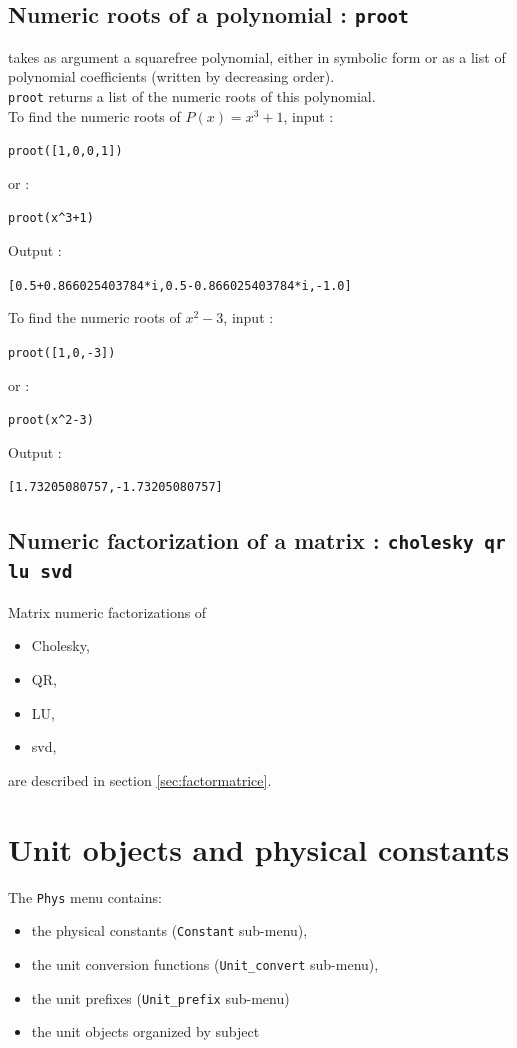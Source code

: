 \documentclass[a4paper,11pt]{book}
\begin{document}
\section{Numeric roots of a polynomial : {\tt proot}}
 takes as argument a squarefree polynomial,
either in symbolic form or as a list of 
polynomial coefficients (written by decreasing order).\\
{\tt proot} returns a list of the numeric roots of this polynomial.\\
To find the numeric roots of $P(x)=x^3+1$, input :
\begin{center}{\tt proot([1,0,0,1]) }\end{center}
or :
\begin{center}{\tt proot(x\verb|^|3+1) }\end{center}
Output :
\begin{center}{\tt [0.5+0.866025403784*i,0.5-0.866025403784*i,-1.0]}\end{center}
To find the numeric roots of $x^2-3$, input :
\begin{center}{\tt proot([1,0,-3])}\end{center}
or  :
\begin{center}{\tt proot(x\verb|^|2-3)}\end{center}
Output :
\begin{center}{\tt [1.73205080757,-1.73205080757]}\end{center} 


\section{Numeric factorization of a matrix : {\tt cholesky qr lu svd}}
Matrix numeric factorizations of
\begin{itemize}
\item Cholesky,
\item QR,
\item LU,
\item svd,
\end{itemize}
are described in section \ref{sec:factormatrice}.

\chapter{Unit objects and physical constants}\label{sec:unit}
The {\tt Phys} menu contains:
\begin{itemize}
\item the physical constants ({\tt Constant} sub-menu), 
\item the unit conversion functions
({\tt Unit\_convert} sub-menu), 
\item the unit prefixes ({\tt  Unit\_prefix} sub-menu) 
\item the unit objects organized by subject
\end{itemize}
\end{document}
